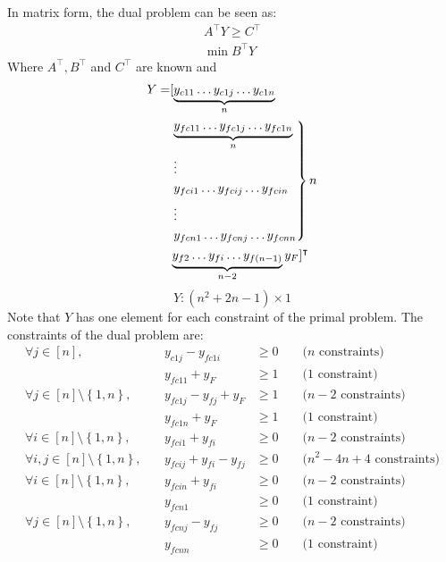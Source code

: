 In matrix form, the dual problem can be seen as:
\begin{equation*}
\begin{gathered}
  A^\intercal Y \geq C^\intercal \\
  \min{B^\intercal Y}
\end{gathered}
\end{equation*}
Where $A^\intercal, B^\intercal$ and $C^\intercal$ are known and
\begin{align*}
  Y = &[\underbrace{y_{c11} \dots y_{c1j} \dots y_{c1n}}_{n} \\
    &\begin{rcases}
      \underbrace{y_{fc11} \dots y_{fc1j} \dots y_{fc1n}}_{n} \\
      \vdots \\
      y_{fci1} \dots y_{fcij} \dots y_{fcin} \\
      \vdots \\
      y_{fcn1} \dots y_{fcnj} \dots y_{fcnn}
    \end{rcases} n \\
    &\underbrace{y_{f2} \dots y_{fi} \dots y_{f\left(n-1\right)}}_{n-2} y_F ]^\intercal
\end{align*}
\begin{equation*}
  Y : \left(n^2 + 2n - 1\right) \times 1
\end{equation*}
Note that $Y$ has one element for each constraint of the primal problem. The constraints of the dual problem are:
\begin{equation}
\label{lp:dual:constraints}
\begin{alignedat}{4}
  \forall j \in \left[n\right], && y_{c1j} - y_{fc1i} &\geq 0 &&\mbox{ ($n$ constraints)} \\
  && y_{fc11} + y_F &\geq 1 &&\mbox{ (1 constraint)} \\
  \forall j \in \left[n\right] \setminus \left\{1, n\right\}, &\:& y_{fc1j} - y_{fj} + y_F &\geq 1 &&
    \mbox{ ($n - 2$ constraints)} \\
  && y_{fc1n} + y_F &\geq 1 &&\mbox{ (1 constraint)} \\
  \forall i \in \left[n\right] \setminus \left\{1, n\right\}, && y_{fci1} + y_{fi} &\geq 0 &&
    \mbox{ ($n - 2$ constraints)} \\
  \forall i, j \in \left[n\right] \setminus \left\{1, n\right\}, &\:& y_{fcij} + y_{fi} - y_{fj} &\geq 0 &&
    \mbox{ ($n^2 - 4n + 4$ constraints)} \\
  \forall i \in \left[n\right] \setminus \left\{1, n\right\}, && y_{fcin} + y_{fi} &\geq 0 &&
    \mbox{ ($n - 2$ constraints)} \\
  && y_{fcn1} &\geq 0 &&\mbox{ (1 constraint)} \\
  \forall j \in \left[n\right] \setminus \left\{1, n\right\}, && y_{fcnj} - y_{fj} &\geq 0 &&
    \mbox{ ($n - 2$ constraints)} \\
  && y_{fcnn} &\geq 0 &&\mbox{ (1 constraint)} \\
\end{alignedat}
\end{equation}
